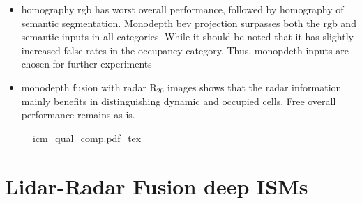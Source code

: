 \begin{itemize}
	\item homography rgb has worst overall performance, followed by homography of semantic segmentation. Monodepth \gls{bev} projection surpasses both the rgb and semantic inputs in all categories. While it should be noted that it has slightly increased false rates in the occupancy category. Thus, monopdeth inputs are chosen for further experiments
	\item monodepth fusion with radar R$_{20}$ images shows that the radar information mainly benefits in distinguishing dynamic and occupied cells. Free overall performance remains as is.
\end{itemize}
\begin{figure}[H]
\begin{center}
	{icm_qual_comp.pdf_tex}
	\caption{\label{fig:icm_qual_comp}}
\end{center}
\end{figure}
%
\section{Lidar-Radar Fusion deep ISMs}
\label{sec:lidar_radar_fusion_in_deep_isms}
%
